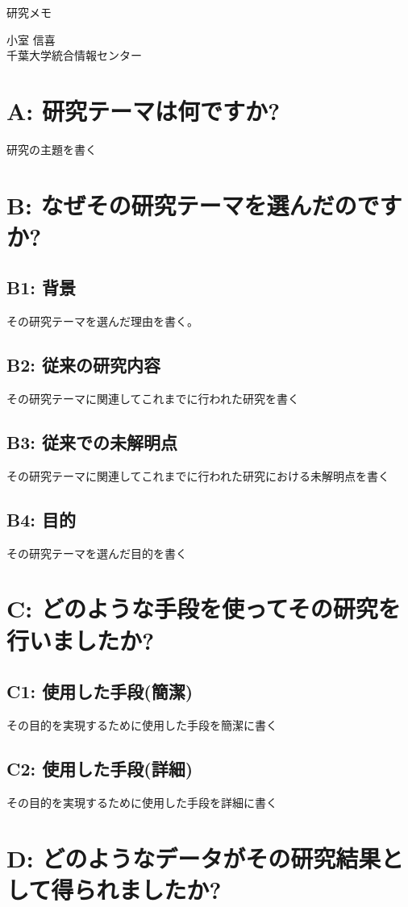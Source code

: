 ﻿\documentclass[a4j,10pt]{jarticle}
\begin{document}
\begin{center}
\large
研究メモ
\end{center}
\begin{flushright}
小室 信喜 \\
千葉大学統合情報センター
\end{flushright}
\hrulefill
\section{A: 研究テーマは何ですか?} 
研究の主題を書く
%
%
\section{B: なぜその研究テーマを選んだのですか?}
\subsection{B1: 背景} 
その研究テーマを選んだ理由を書く。
%
%
\subsection{B2: 従来の研究内容} 
その研究テーマに関連してこれまでに行われた研究を書く
%
%
\subsection{B3: 従来での未解明点} 
その研究テーマに関連してこれまでに行われた研究における未解明点を書く
%
%
\subsection{B4: 目的} 
その研究テーマを選んだ目的を書く
%
%
\section{C: どのような手段を使ってその研究を行いましたか?}
\subsection{C1: 使用した手段(簡潔)} 
その目的を実現するために使用した手段を簡潔に書く
%
%
\subsection{C2: 使用した手段(詳細)} 
その目的を実現するために使用した手段を詳細に書く
%
%
\section{D: どのようなデータがその研究結果として得られましたか?}
\end{document}
